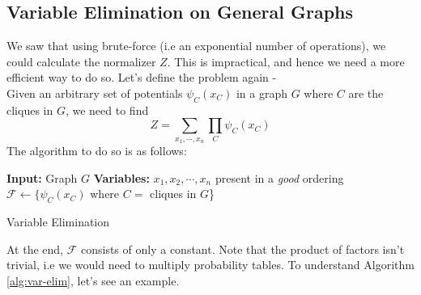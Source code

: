 \subsection{Variable Elimination on General Graphs}
We saw that using brute-force (i.e an exponential number of operations), we could calculate the normalizer $Z$. This is impractical, and hence we need a more efficient way to do so. Let's define the problem again - \\
Given an arbitrary set of potentials $\psi_C(x_C)$ in a graph $G$ where $C$ are the cliques in $G$, we need to find 
\[ Z = \sum_{x_1,\cdots,x_n} \prod_C \psi_C(x_C)\]
The algorithm to do so is as follows: \\
\begin{algorithm}[H]\label{alg:var-elim}
	\DontPrintSemicolon
	\textbf{Input:} Graph $G$\;
	\textbf{Variables:} $x_1, x_2, \cdots, x_n$ present in a \textit{good} ordering\;
	$\mathcal F \longleftarrow \{\psi_C(x_C)$ where $C=$ cliques in $G$\}  \;
	\caption{Variable Elimination}
\end{algorithm}
At the end, $\mathcal F$ consists of only a constant. Note that the product of factors isn't trivial, i.e we would need to multiply probability tables. To understand Algorithm \ref{alg:var-elim}, let's see an example.
